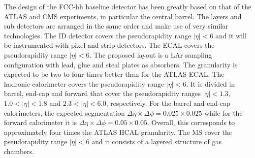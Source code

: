 The design of the FCC-hh baseline detector has been greatly based on that of the ATLAS and CMS experiments, in particular the central barrel. The layers and sub detectors are arranged in the same order and make use of very similar technologies. The ID detector covers the pseudorapidity range $|\eta|<6$ and it will be instrumented with pixel and strip detectors. The ECAL covers the pseudorapidity range $|\eta|<6$. The proposed layout is a LAr sampling configuration with lead, glue and steal plates as absorbers. The granularity is expected to be two to four times better than for the ATLAS ECAL. The hadronic calorimeter covers the pseudorapidity range $|\eta| < 6$. It is divided in barrel, end-cap and forward that cover the pseudorapidity ranges $|\eta| < 1.3$, $1.0 < |\eta| < 1.8$ and $2.3 < |\eta| < 6.0$, respectively. For the barrel and end-cap calorimeters, the expected segmentation $\Delta\eta\times\Delta\phi = 0.025 \times 0.025$ while for the forward calorimeter it is $\Delta\eta\times\Delta\phi = 0.05 \times 0.05$. Overall, this corresponds to approximately four times the ATLAS HCAL granularity. The MS cover the pseudorapidity range $|\eta|<6$ and it consists of a layered structure of gas chambers.